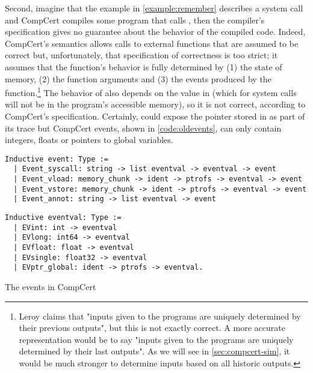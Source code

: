 Second, imagine that the example in \ref{example:remember} describes a system call and CompCert compiles some program that calls , then the compiler's specification gives no guarantee about the behavior of the compiled code. Indeed, CompCert's semantics allows calls to external functions that are assumed to be correct but, unfortunately, that specification of correctness is too strict; it  assumes that the function's behavior is fully determined by (1) the state of memory, (2) the function arguments and (3) the events produced by the function.\footnote{Leroy \cite{Leroy-Compcert-CACM} claims that "inputs given to the programs are uniquely determined by their previous outputs", but this is not exactly correct. A more accurate representation would be to say "inputs given to the programs are uniquely determined by their last outputs". As we will see in \ref{sec:compcert-sim}, it would be much stronger to determine inputs based on all historic outputs.} The behavior of  also depends on the value in  (which for system calls will not be in the program's accessible memory), so it is not correct, according to CompCert's specification. Certainly,  could expose the pointer stored in  as part of its trace but CompCert events, shown in \ref{code:oldevents}, can only contain integers, floats or pointers to global variables.
 
\begin{table}\centering
\begin{multicols}{2}
\begin{lstlisting}[style=CoqTheorem-list]
Inductive event: Type :=
  | Event_syscall: string -> list eventval -> eventval -> event
  | Event_vload: memory_chunk -> ident -> ptrofs -> eventval -> event
  | Event_vstore: memory_chunk -> ident -> ptrofs -> eventval -> event
  | Event_annot: string -> list eventval -> event
  \end{lstlisting}
  
  \begin{lstlisting}
Inductive eventval: Type :=
  | EVint: int -> eventval
  | EVlong: int64 -> eventval
  | EVfloat: float -> eventval
  | EVsingle: float32 -> eventval
  | EVptr_global: ident -> ptrofs -> eventval.
  \end{lstlisting}
\end{multicols}
\caption{The events in CompCert}\label{code:oldevents}
\end{table}

